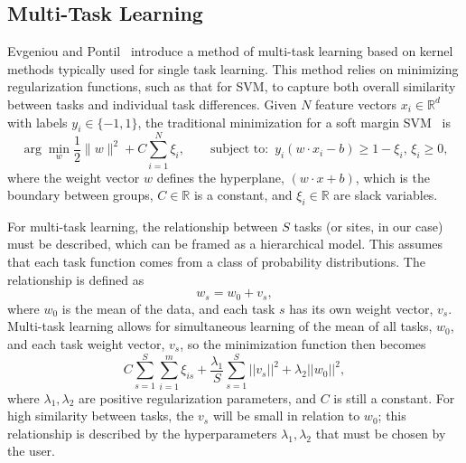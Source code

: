 \documentclass{llncs}
\begin{document}

\subsection{Multi-Task Learning}
\label{subsec:MTL}
Evgeniou and Pontil~\cite{regMTL} introduce a method of multi-task learning
based on kernel methods typically used for single task learning.  This method
relies on minimizing regularization functions, such as that for SVM, to capture
both overall similarity between tasks and individual task differences. Given $N$
feature vectors $x_i \in \mathbb{R}^d$ with labels $y_i \in \{-1, 1\}$, the
traditional minimization for a soft margin SVM~\cite{svm} is
\begin{equation}
\label{eq:svm}
\arg \min_{w} \frac{1}{2}\|w\|^2 + C \sum_{i=1}^N \xi_i,
\quad\quad \text{subject to:}\,\,\, y_i (w \cdot x_i - b) \geq 1 - \xi_i,\,\xi_i
\geq 0,
\end{equation}
where the weight vector $w$ defines the hyperplane, $(w \cdot x +b)$,
which is the boundary between groups, $C \in \mathbb{R}$ is a constant, and $\xi_i
\in \mathbb{R}$ are slack variables.

For multi-task learning, the relationship between $S$ tasks (or sites, in our
case) must be described, which can be framed as a hierarchical model. This
assumes that each task function comes from a class of probability distributions.
The relationship is defined as
\begin{equation}
\label{eq:sim}
 w_s = w_0 + v_s ,
\end{equation}
where $w_0$ is the mean of the data, and each task $s$ has its own weight
vector, $v_s$. Multi-task learning allows for simultaneous learning of the mean
of all tasks, $w_0$, and each task weight vector, $v_s$, so the minimization
function then becomes
\begin{equation}
\label{eq:mtlsvm}
 C \sum_{s=1}^S \sum_{i=1}^m \xi_{is} + \frac{\lambda_1}{S} \sum_{s=1}^S ||v_s||^2 + \lambda_2||w_0||^2 ,
\end{equation}
where $\lambda_1, \lambda_2$ are positive regularization parameters, and $C$ is
still a constant. For high similarity between tasks, the $v_s$ will be small in
relation to $w_0$; this relationship is described by the hyperparameters
$\lambda_1, \lambda_2$ that must be chosen by the user.
\end{document}
